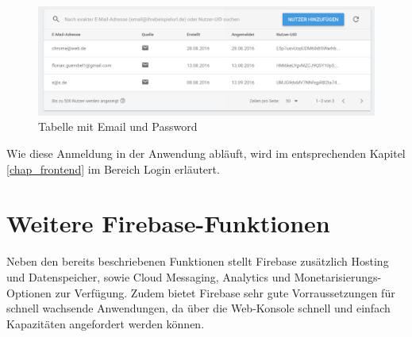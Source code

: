 \begin{figure}[H]
\centering\includegraphics[width=1\textwidth]{images/backend_authentication.png}
\caption{Tabelle mit Email und Password}
\label{backend_authentication}
\end{figure}

Wie diese Anmeldung in der Anwendung abläuft, wird im entsprechenden Kapitel \ref{chap_frontend}  im Bereich Login erläutert.

\section{Weitere Firebase-Funktionen}
Neben den bereits beschriebenen Funktionen stellt Firebase zusätzlich Hosting und Datenspeicher, sowie Cloud Messaging, Analytics und Monetarisierungs-Optionen zur Verfügung.
Zudem bietet Firebase sehr gute Vorraussetzungen für schnell wachsende Anwendungen, da über die Web-Konsole schnell und einfach Kapazitäten angefordert werden können.